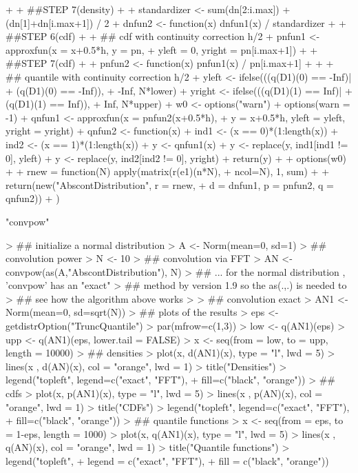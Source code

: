 \documentclass[11pt]{article}
\begin{document}
\begin{Schunk}
\begin{Sinput}
{+
+     ##STEP 7(density)
+
+             standardizer <- sum(dn[2:i.max]) + (dn[1]+dn[i.max+1]) / 2
+             dnfun2 <- function(x) dnfun1(x) / standardizer
+
+     ##STEP 6(cdf)
+
+             ## cdf with continuity correction h/2
+             pnfun1 <- approxfun(x = x+0.5*h, y = pn,
+                         yleft = 0, yright = pn[i.max+1])
+
+     ##STEP 7(cdf)
+
+             pnfun2 <- function(x) pnfun1(x) / pn[i.max+1]
+
+
+             ## quantile with continuity correction h/2
+             yleft <- ifelse(((q(D1)(0) == -Inf)|
+                              (q(D1)(0) == -Inf)),
+                              -Inf, N*lower)
+             yright <- ifelse(((q(D1)(1) == Inf)|
+                               (q(D1)(1) == Inf)),
+                               Inf, N*upper)
+             w0 <- options("warn")
+             options(warn = -1)
+             qnfun1 <- approxfun(x = pnfun2(x+0.5*h),
+                         y = x+0.5*h, yleft = yleft, yright = yright)
+             qnfun2 <- function(x){
+             ind1 <- (x == 0)*(1:length(x))
+             ind2 <- (x == 1)*(1:length(x))
+             y <- qnfun1(x)
+             y <- replace(y, ind1[ind1 != 0], yleft)
+             y <- replace(y, ind2[ind2 != 0], yright)
+             return(y)
+             }
+             options(w0)
+
+             rnew = function(N) apply(matrix(r(e1)(n*N),
+                                      ncol=N), 1, sum)
+
+             return(new("AbscontDistribution", r = rnew,
+                        d = dnfun1, p = pnfun2, q = qnfun2))
+ })
\end{Sinput}
\begin{Soutput}
[1] "convpow"
\end{Soutput}
\begin{Sinput}
> ## initialize a normal distribution
> A <- Norm(mean=0, sd=1)
> ## convolution power
> N <- 10
> ## convolution via FFT
> AN <- convpow(as(A,"AbscontDistribution"), N)
> ##  ... for the normal distribution , 'convpow' has an "exact"
> ##      method by version 1.9 so the as(.,.)  is needed to
> ##      see how the algorithm above works
>
> ## convolution exact
> AN1 <- Norm(mean=0, sd=sqrt(N))
> ## plots of the results
> eps <- getdistrOption("TruncQuantile")
> par(mfrow=c(1,3))
> low <- q(AN1)(eps)
> upp <- q(AN1)(eps, lower.tail = FALSE)
> x <- seq(from = low, to = upp, length = 10000)
> ## densities
> plot(x, d(AN1)(x), type = "l", lwd = 5)
> lines(x , d(AN)(x), col = "orange", lwd = 1)
> title("Densities")
> legend("topleft", legend=c("exact", "FFT"),
+         fill=c("black", "orange"))
> ## cdfs
> plot(x, p(AN1)(x), type = "l", lwd = 5)
> lines(x , p(AN)(x), col = "orange", lwd = 1)
> title("CDFs")
> legend("topleft", legend=c("exact", "FFT"),
+         fill=c("black", "orange"))
> ## quantile functions
> x <- seq(from = eps, to = 1-eps, length = 1000)
> plot(x, q(AN1)(x), type = "l", lwd = 5)
> lines(x , q(AN)(x), col = "orange", lwd = 1)
> title("Quantile functions")
> legend("topleft",
+        legend = c("exact", "FFT"),
+         fill = c("black", "orange"))
\end{Sinput}
\end{Schunk}
\end{document}

